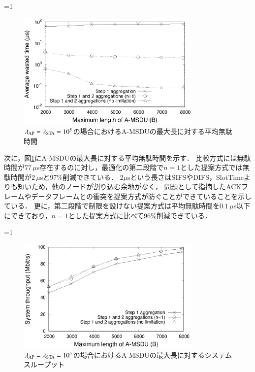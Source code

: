 \documentclass[master]{kuisthesis}		%
\newcounter{flagFig}
\begin{document}
			\ifnum\value{flagFig}=1 {\begin{figure}[htbp]
				\begin{center}
					\includegraphics[width=0.8\textwidth]{graph/wst_max.eps}
					\caption{$\lambda_{\rm AP}=\lambda_{\rm STA}=10^5$の場合におけるA-MSDUの最大長に対する平均無駄時間}
					\label{fig:wst_max}
				\end{center}
			\end{figure}}\fi
			次に，図\ref{fig:wst_max}にA-MSDUの最大長に対する平均無駄時間を示す．
			比較方式には無駄時間が$77\,\mu$s存在するのに対し，最適化の第二段階で$n=1$とした提案方式では無駄時間が$2\,\mu$sと97\%削減できている．
			2$\mu$sという長さはSIFSやDIFS，SlotTimeよりも短いため，他のノードが割り込む余地がなく，
			問題として指摘したACKフレームやデータフレームとの衝突を提案方式が防ぐことができていることを示している．
			更に，第二段階で制限を設けない提案方式は平均無駄時間を$0.1\,\mu$s以下にできており，$n=1$とした提案方式に比べて96\%削減できている．
			\par
			\ifnum\value{flagFig}=1 {\begin{figure}[htbp]
				\begin{center}
					\includegraphics[width=0.8\textwidth]{graph/thr_max.eps}
					\caption{$\lambda_{\rm AP}=\lambda_{\rm STA}=10^5$の場合におけるA-MSDUの最大長に対するシステムスループット}
					\label{fig:thr_max}
				\end{center}
			\end{figure}}\fi
\end{document}
